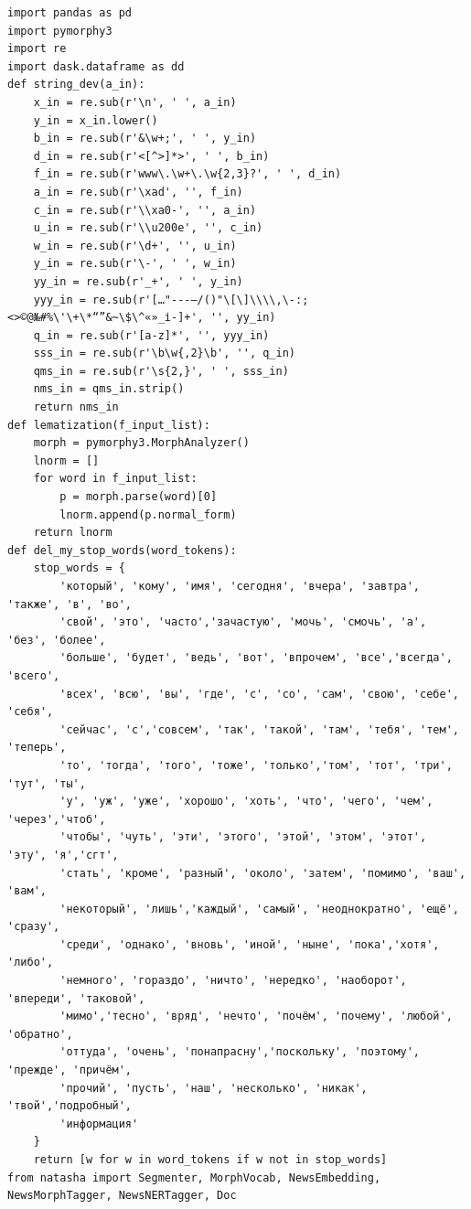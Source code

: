 \documentclass[coursework]{SCWorks}
\begin{document}
\begin{verbatim}
import pandas as pd
import pymorphy3
import re
import dask.dataframe as dd
def string_dev(a_in):
    x_in = re.sub(r'\n', ' ', a_in)
    y_in = x_in.lower()
    b_in = re.sub(r'&\w+;', ' ', y_in)
    d_in = re.sub(r'<[^>]*>', ' ', b_in)
    f_in = re.sub(r'www\.\w+\.\w{2,3}?', ' ', d_in)
    a_in = re.sub(r'\xad', '', f_in)
    c_in = re.sub(r'\\xa0-', '', a_in)
    u_in = re.sub(r'\\u200e', '', c_in)
    w_in = re.sub(r'\d+', '', u_in)
    y_in = re.sub(r'\-', ' ', w_in)
    yy_in = re.sub(r'_+', ' ', y_in)
    yyy_in = re.sub(r'[…"---–/()"\[\]\\\\,\-:;<>©@№#%\'\+\*“”&~\$\^«»_і‑]+', '', yy_in)
    q_in = re.sub(r'[a-z]*', '', yyy_in)
    sss_in = re.sub(r'\b\w{,2}\b', '', q_in)
    qms_in = re.sub(r'\s{2,}', ' ', sss_in)
    nms_in = qms_in.strip()
    return nms_in
def lematization(f_input_list):
    morph = pymorphy3.MorphAnalyzer()
    lnorm = []
    for word in f_input_list:
        p = morph.parse(word)[0]
        lnorm.append(p.normal_form)
    return lnorm
def del_my_stop_words(word_tokens):
    stop_words = {
        'который', 'кому', 'имя', 'сегодня', 'вчера', 'завтра', 'также', 'в', 'во', 
        'свой', 'это', 'часто','зачастую', 'мочь', 'смочь', 'а', 'без', 'более', 
        'больше', 'будет', 'ведь', 'вот', 'впрочем', 'все','всегда', 'всего', 
        'всех', 'всю', 'вы', 'где', 'с', 'со', 'сам', 'свою', 'себе', 'себя', 
        'сейчас', 'c','совсем', 'так', 'такой', 'там', 'тебя', 'тем', 'теперь', 
        'то', 'тогда', 'того', 'тоже', 'только','том', 'тот', 'три', 'тут', 'ты', 
        'у', 'уж', 'уже', 'хорошо', 'хоть', 'что', 'чего', 'чем', 'через','чтоб', 
        'чтобы', 'чуть', 'эти', 'этого', 'этой', 'этом', 'этот', 'эту', 'я','сгт', 
        'стать', 'кроме', 'разный', 'около', 'затем', 'помимо', 'ваш', 'вам', 
        'некоторый', 'лишь','каждый', 'самый', 'неоднократно', 'ещё', 'сразу', 
        'среди', 'однако', 'вновь', 'иной', 'ныне', 'пока','хотя', 'либо', 
        'немного', 'гораздо', 'ничто', 'нередко', 'наоборот', 'впереди', 'таковой', 
        'мимо','тесно', 'вряд', 'нечто', 'почём', 'почему', 'любой', 'обратно', 
        'оттуда', 'очень', 'понапрасну','поскольку', 'поэтому', 'прежде', 'причём', 
        'прочий', 'пусть', 'наш', 'несколько', 'никак', 'твой','подробный', 
        'информация'
    }
    return [w for w in word_tokens if w not in stop_words]
from natasha import Segmenter, MorphVocab, NewsEmbedding, NewsMorphTagger, NewsNERTagger, Doc

\end{verbatim}
\end{document}
